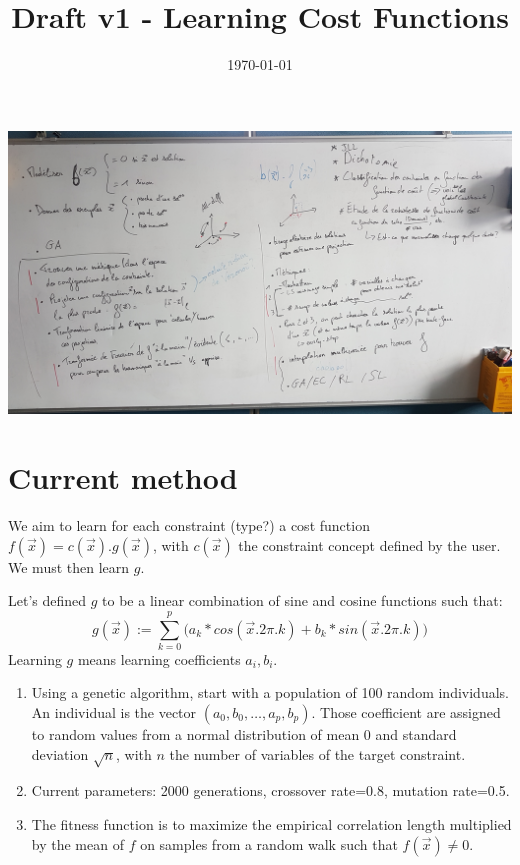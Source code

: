\documentclass[a4paper, 12pt]{article}
\title{Draft v1 - Learning Cost Functions}
\date{\today}
\begin{document}
\maketitle

\includegraphics[width=\linewidth,angle=180]{20190529_whiteboard}

\section{Current method}
We  aim  to  learn  for  each  constraint  (type?)   a  cost  function
$f(\vec{x}) = c(\vec{x}).g(\vec{x})$, with $c(\vec{x})$ the constraint
concept defined by the user. We must then learn $g$.

Let's  defined $g$  to  be a  linear combination  of  sine and  cosine
functions such that:
\begin{displaymath}
g(\vec{x}) := \sum_{k=0}^{p}\big(a_k * cos(\vec{x}.2\pi.k) + b_k * sin(\vec{x}.2\pi.k)\big)
\end{displaymath}
Learning $g$ means learning coefficients $a_i, b_i$.
\begin{enumerate}
\item Using a genetic algorithm, start with a population of 100 random
  individuals. An  individual is the  vector $(a_0, b_0,  \ldots, a_p,
  b_p)$. Those coefficient are assigned to random values from a normal
  distribution of mean 0 and standard deviation $\sqrt n$, with $n$
  the number of variables of the target constraint.
\item  Current  parameters:   2000  generations,  crossover  rate=0.8,
  mutation rate=0.5.  
\item The  fitness function is  to maximize the  empirical correlation
  length multiplied by  the mean of $f$ on samples  from a random walk
  such that $f(\vec{x}) \neq 0$.
\end{enumerate}
\end{document}
